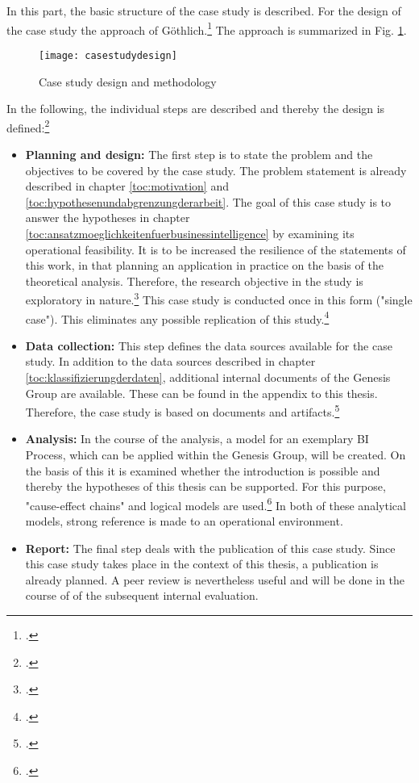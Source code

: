 In this part, the basic structure of the case study is described. For the design of the case study the approach of
Göthlich.\footcite[Cf.][]{gothlich2003fallstudien} The approach is summarized in Fig.
\ref{figure:casestudydesign}.

\begin{figure}[H]
    \caption{Case study design and methodology}
    \texttt{[image: casestudydesign]}
    \label{figure:casestudydesign}
    \\
    \cite[Source: Based on][pp. 8]{gothlich2003fallstudien}
\end{figure}

In the following, the individual steps are described and thereby the design is
defined:\footcite[Cf.][pp. 8]{gothlich2003fallstudien}
\begin{itemize}
    \item \textbf{Planning and design: }The first step is to state the problem and the objectives to be covered by the case study.
    The problem statement is already described in chapter \ref{toc:motivation} and \ref{toc:hypothesenundabgrenzungderarbeit}.
    The goal of this case study is to answer the hypotheses in chapter \ref{toc:ansatzmoeglichkeitenfuerbusinessintelligence}
    by examining its operational feasibility. It is to be increased the resilience of the statements of this work, in that
    planning an application in practice on the basis of the theoretical analysis.
    Therefore, the research objective in the study is exploratory in nature.\footcite[Cf.][p. 8]{gothlich2003fallstudien}
    This case study is conducted once in this form ("single case"). This eliminates any possible replication of this study.\footcite[Cf.][pp. 8]{gothlich2003fallstudien}
    \item \textbf{Data collection: }This step defines the data sources available for the case study. In addition to the
    data sources described in chapter \ref{toc:klassifizierungderdaten}, additional internal documents of the Genesis
    Group are available. These can be found in the appendix to this thesis. Therefore, the case study is based on documents and artifacts.\footcite[Cf.][Table 1 ]{gothlich2003fallstudien}
    \item \textbf{Analysis: }In the course of the analysis, a model for an exemplary \ac{BI} Process,
    which can be applied within the Genesis Group, will be created. On the basis of this it is examined whether the introduction is possible and thereby the
    hypotheses of this thesis can be supported. For this purpose, "cause-effect chains" and logical models are used.\footcite[Cf.][p. 11]{gothlich2003fallstudien}
    In both of these analytical models, strong reference is made to an operational environment.
    \item \textbf{Report: }The final step deals with the publication of this case study. Since this case study takes place in the context
    of this thesis, a publication is already planned. A peer review is nevertheless useful and will be done in the course of
    of the subsequent internal evaluation.
\end{itemize}

